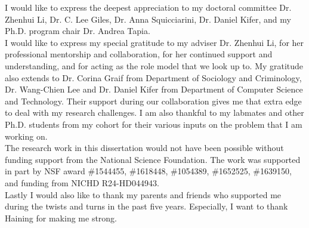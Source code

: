 

I would like to express the deepest appreciation to my doctoral committee Dr. Zhenhui Li, Dr. C. Lee Giles, Dr. Anna Squicciarini, Dr. Daniel Kifer, and my Ph.D. program chair Dr. Andrea Tapia. \\

I would like to express my special gratitude to my adviser Dr. Zhenhui Li, for her professional mentorship and collaboration, for her continued support and understanding, and for acting as the role model that we look up to. My gratitude also extends to Dr. Corina Graif from Department of Sociology and Criminology, Dr. Wang-Chien Lee and Dr. Daniel Kifer from Department of Computer Science and Technology. Their support during our collaboration gives me that extra edge to deal with my research challenges. I am also thankful to my labmates and other Ph.D. students from my cohort for their various inputs on the problem that I am working on. \\

The research work in this dissertation would not have been possible without funding support from the National Science Foundation. The work was supported in part by NSF award \#1544455, \#1618448, \#1054389, \#1652525, \#1639150, and funding from NICHD R24-HD044943. \\

Lastly I would also like to thank my parents and friends who supported me during the twists and turns in the past five years. Especially, I want to thank Haining for making me strong.